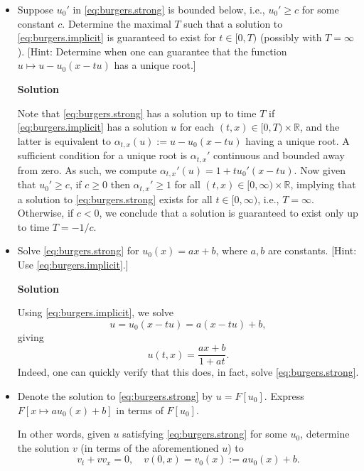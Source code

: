 \documentclass{article}
\begin{document}
\begin{itemize}
\item[2.] Suppose $u_0'$ in \eqref{eq:burgers.strong} is bounded below, i.e., $u_0' \geq c$ for some constant $c$. Determine the maximal $T$ such that a solution to \eqref{eq:burgers.implicit} is guaranteed to exist for $t \in [0,T)$ (possibly with $T = \infty$). [Hint: Determine when one can guarantee that the function $u \mapsto u - u_0(x - tu)$ has a unique root.]

\textbf{Solution}

Note that \eqref{eq:burgers.strong} has a solution up to time $T$ if \eqref{eq:burgers.implicit} has a solution $u$ for each $(t,x) \in [0,T) \times \mathbb{R}$, and the latter is equivalent to $\alpha_{t,x}(u) := u - u_0(x - tu)$ having a unique root. A sufficient condition for a unique root is $\alpha_{t,x}'$ continuous and bounded away from zero. As such, we compute $\alpha_{t,x}'(u) = 1 + t u_0'(x - tu)$. Now given that $u_0' \geq c$, if $c \geq 0$ then $\alpha_{t,x}' \geq 1$ for all $(t,x) \in [0,\infty) \times \mathbb{R}$, implying that a solution to \eqref{eq:burgers.strong} exists for all $t \in [0,\infty)$, i.e., $T = \infty$. Otherwise, if $c < 0$, we conclude that a solution is guaranteed to exist only up to time $T = -1/c$.

\item[3.] Solve \eqref{eq:burgers.strong} for $u_0(x) = ax + b$, where $a,b$ are constants. [Hint: Use \eqref{eq:burgers.implicit}.]

\textbf{Solution}

Using \eqref{eq:burgers.implicit}, we solve
\begin{equation*}
u = u_0 \left( x - tu \right) = a \left( x - tu \right) + b,
\end{equation*}
giving
\begin{equation*}
u(t,x) = \frac{ax + b}{1 + at}.
\end{equation*}
Indeed, one can quickly verify that this does, in fact, solve \eqref{eq:burgers.strong}.

\item[4.] Denote the solution to \eqref{eq:burgers.strong} by $u = F \left[ u_0 \right]$. Express $F \left[ x \mapsto a u_0(x) + b \right]$ in terms of $F \left[ u_0 \right]$.

In other words, given $u$ satisfying \eqref{eq:burgers.strong} for some $u_0$, determine the solution $v$ (in terms of the aforementioned $u$) to
\begin{equation*}
v_t + v v_x = 0, \quad v(0,x) = v_0(x) := a u_0(x) + b.
\end{equation*}


\end{itemize}
\end{document}
